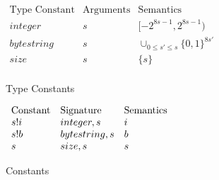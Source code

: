 \documentclass[../main.tex]{subfiles}
\begin{document}
\begin{figure*}[t]


    \(\begin{array}{lllll}
        \textrm{Type Constant} & \textrm{Arguments} & \textrm{Semantics}\\

        integer & s & [-2^{8s-1},2^{8s-1})\\

        bytestring & s & \cup_{0\leq s' \leq s}\{0,1\}^{8s'}\\

        size & s & \{s\}\\
   \end{array}\)
   \caption{Type Constants}
   \label{fig:Plutus_core_type_constants}

\end{figure*}

\begin{figure*}
   \(\begin{array}{lllll}
        \textrm{Constant} & \textrm{Signature} & \textrm{Semantics}\\
        s!i   & integer,s & i\\
        s!b   & bytestring,s & b\\
        s     & size,s & s\\
    \end{array}\)
    \caption{Constants}
    \label{fig:Plutus_core_constants}
\end{figure*}
\end{document}
